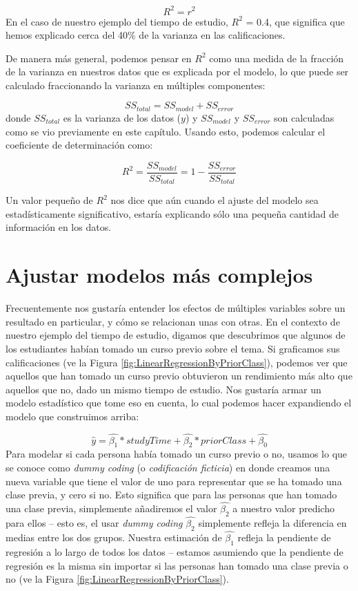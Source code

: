 \documentclass[
  12pt,
]{book}
\begin{document}
\[
R^2 = r^2
\]
En el caso de nuestro ejemplo del tiempo de estudio, \(R^2\) = 0.4, que significa que hemos explicado cerca del 40\% de la varianza en las calificaciones.

De manera más general, podemos pensar en \(R^2\) como una medida de la fracción de la varianza en nuestros datos que es explicada por el modelo, lo que puede ser calculado fraccionando la varianza en múltiples componentes:

\[
SS_{total} = SS_{model} + SS_{error}
\]
donde \(SS_{total}\) es la varianza de los datos (\(y\)) y \(SS_{model}\) y \(SS_{error}\) son calculadas como se vio previamente en este capítulo. Usando esto, podemos calcular el coeficiente de determinación como:

\[
R^2 = \frac{SS_{model}}{SS_{total}} = 1 - \frac{SS_{error}}{SS_{total}}
\]

Un valor pequeño de \(R^2\) nos dice que aún cuando el ajuste del modelo sea estadísticamente significativo, estaría explicando sólo una pequeña cantidad de información en los datos.

\hypertarget{ajustar-modelos-muxe1s-complejos}{%
\section{Ajustar modelos más complejos}\label{ajustar-modelos-muxe1s-complejos}}

Frecuentemente nos gustaría entender los efectos de múltiples variables sobre un resultado en particular, y cómo se relacionan unas con otras. En el contexto de nuestro ejemplo del tiempo de estudio, digamos que descubrimos que algunos de los estudiantes habían tomado un curso previo sobre el tema. Si graficamos sus calificaciones (ve la Figura \ref{fig:LinearRegressionByPriorClass}), podemos ver que aquellos que han tomado un curso previo obtuvieron un rendimiento más alto que aquellos que no, dado un mismo tiempo de estudio. Nos gustaría armar un modelo estadístico que tome eso en cuenta, lo cual podemos hacer expandiendo el modelo que construimos arriba:

\[
\hat{y} = \hat{\beta_1}*studyTime + \hat{\beta_2}*priorClass + \hat{\beta_0}
\]
Para modelar si cada persona había tomado un curso previo o no, usamos lo que se conoce como \emph{dummy coding} (o \emph{codificación ficticia}) en donde creamos una nueva variable que tiene el valor de uno para representar que se ha tomado una clase previa, y cero si no. Esto significa que para las personas que han tomado una clase previa, simplemente añadiremos el valor \(\hat{\beta_2}\) a nuestro valor predicho para ellos -- esto es, el usar \emph{dummy coding} \(\hat{\beta_2}\) simplemente refleja la diferencia en medias entre los dos grupos. Nuestra estimación de \(\hat{\beta_1}\) refleja la pendiente de regresión a lo largo de todos los datos -- estamos asumiendo que la pendiente de regresión es la misma sin importar si las personas han tomado una clase previa o no (ve la Figura \ref{fig:LinearRegressionByPriorClass}).
\end{document}
